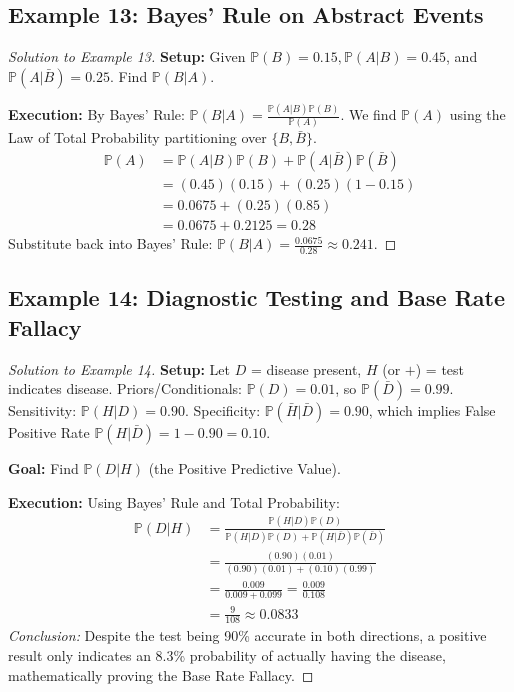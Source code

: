 \documentclass[12pt, a4paper]{article}
\theoremstyle{definition}
\theoremstyle{remark}
\newcommand{\Prob}{\mathbb{P}}
\newcommand{\1}{\mathbf{1}}
\begin{document}
\subsection*{Example 13: Bayes' Rule on Abstract Events}
\begin{proof}[Solution to Example 13]
\textbf{Setup:} Given $\Prob(B) = 0.15, \Prob(A|B) = 0.45$, and $\Prob(A|\bar{B}) = 0.25$. Find $\Prob(B|A)$.

\textbf{Execution:}
By Bayes' Rule: $\Prob(B|A) = \frac{\Prob(A|B)\Prob(B)}{\Prob(A)}$.
We find $\Prob(A)$ using the Law of Total Probability partitioning over $\{B, \bar{B}\}$.
\begin{align*}
\Prob(A) &= \Prob(A|B)\Prob(B) + \Prob(A|\bar{B})\Prob(\bar{B}) \\
&= (0.45)(0.15) + (0.25)(1 - 0.15) \\
&= 0.0675 + (0.25)(0.85) \\
&= 0.0675 + 0.2125 = 0.28
\end{align*}
Substitute back into Bayes' Rule:
$\Prob(B|A) = \frac{0.0675}{0.28} \approx 0.241$.
\end{proof}

\subsection*{Example 14: Diagnostic Testing and Base Rate Fallacy}
\begin{proof}[Solution to Example 14]
\textbf{Setup:} Let $D$ = disease present, $H$ (or $+$) = test indicates disease.
Priors/Conditionals: $\Prob(D) = 0.01$, so $\Prob(\bar{D}) = 0.99$. 
Sensitivity: $\Prob(H|D) = 0.90$. 
Specificity: $\Prob(\bar{H}|\bar{D}) = 0.90$, which implies False Positive Rate $\Prob(H|\bar{D}) = 1 - 0.90 = 0.10$.

\textbf{Goal:} Find $\Prob(D|H)$ (the Positive Predictive Value).

\textbf{Execution:}
Using Bayes' Rule and Total Probability:
\begin{align*}
\Prob(D|H) &= \frac{\Prob(H|D)\Prob(D)}{\Prob(H|D)\Prob(D) + \Prob(H|\bar{D})\Prob(\bar{D})} \\
&= \frac{(0.90)(0.01)}{(0.90)(0.01) + (0.10)(0.99)} \\
&= \frac{0.009}{0.009 + 0.099} = \frac{0.009}{0.108} \\
&= \frac{9}{108} \approx 0.0833
\end{align*}
\textit{Conclusion:} Despite the test being 90\% accurate in both directions, a positive result only indicates an 8.3\% probability of actually having the disease, mathematically proving the Base Rate Fallacy.
\end{proof}
\end{document}
